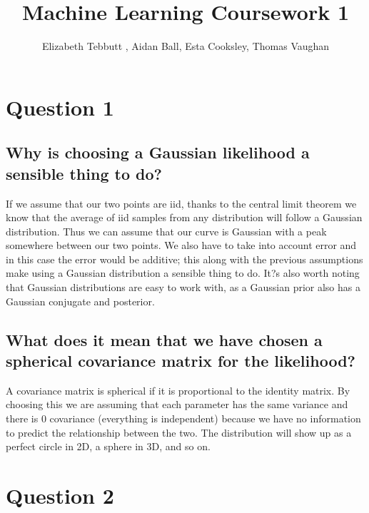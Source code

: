 \documentclass[a4paper, 9pt]{article}
\title{Machine Learning Coursework 1}
\author{Elizabeth Tebbutt , Aidan Ball, Esta Cooksley, Thomas Vaughan}
\begin{document}
\maketitle
\section*{Question 1}
\subsection*{Why is choosing a Gaussian likelihood a sensible thing to do?}
If we assume that our two points are iid, thanks to the central limit theorem we know that the average of iid samples from any distribution will follow a Gaussian distribution. Thus we can assume that our curve is Gaussian with a peak somewhere between our two points. We also have to take into account error and in this case the error would be additive; this along with the previous assumptions make using a Gaussian distribution a sensible thing to do.
It?s also worth noting that Gaussian distributions are easy to work with, as a Gaussian prior also has a Gaussian conjugate and posterior.
\subsection*{What does it mean that we have chosen a spherical covariance matrix for the likelihood?}
A covariance matrix is spherical if it is proportional to the identity matrix. By choosing this we are assuming that each parameter has the same variance and there is 0 covariance (everything is independent) because we have no information to predict the relationship between the two. The distribution will show up as a perfect circle in 2D, a sphere in 3D, and so on.

\section*{Question 2}
\end{document}
